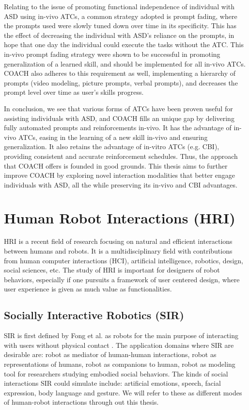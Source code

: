 \documentclass{ut-thesis}
\begin{document}
Relating to the issue of promoting functional independence of individual with ASD using in-vivo ATCs, a common strategy adopted is prompt fading, where the prompts used were slowly tuned down over time in its specificity.  This has the effect of decreasing the individual with ASD's reliance on the prompts, in hope that one day the individual could execute the tasks without the ATC.  This in-vivo prompt fading strategy were shown to be successful in promoting generalization of a learned skill, and should be implemented for all in-vivo ATCs.  COACH also adheres to this requirement as well, implementing a hierarchy of prompts (video modeling, picture prompts, verbal prompts), and decreases the prompt level over time as user's skills progress.

In conclusion, we see that various forms of ATCs have been proven useful for assisting individuals with ASD, and COACH fills an unique gap by delivering fully automated prompts and reinforcements in-vivo.  It has the advantage of in-vivo ATCs, easing in the learning of a new skill in-vivo and ensuring generalization.  It also retains the advantage of in-vitro ATCs (e.g. CBI), providing consistent and accurate reinforcement schedules.  Thus, the approach that COACH offers is founded in good grounds.  This thesis aims to further improve COACH by exploring novel interaction modalities that better engage individuals with ASD, all the while preserving its in-vivo and CBI advantages.
\section{Human Robot Interactions (HRI)}

HRI is a recent field of research focusing on natural and efficient interactions between humans and robots.  It is a multidisciplinary field with contributions from human computer interactions (HCI), artificial intelligence, robotics, design, social sciences, etc.  The study of HRI is important for designers of robot behaviors, especially if one pursuits a framework of user centered design, where user experience is given as much value as functionalities. 


\subsection{Socially Interactive Robotics (SIR)}
SIR is first defined by Fong et al. as robots for the main purpose of interacting with users without physical contact \cite{fong2003survey}.  The application domains where SIR are desirable are: robot as mediator of human-human interactions, robot as representations of humans, robot as companions to human, robot as modeling tool for researchers studying embodied social behaviors.  The kinds of social interactions SIR could simulate include: artificial emotions, speech, facial expression, body language and gesture.  We will refer to these as different modes of human-robot interactions through out this thesis.
\end{document}
